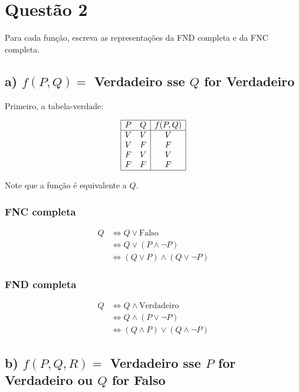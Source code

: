 \section*{Questão 2}

Para cada função, escreva as representações da FND completa e da FNC completa.

\subsection*{a) $f(P, Q) =$ Verdadeiro sse $Q$ for Verdadeiro}

Primeiro, a tabela-verdade:

\[
\begin{array}{|c c|c|}
\hline
P & Q & f(P, Q) \\
\hline
V & V & V \\
V & F & F \\
F & V & V \\
F & F & F \\
\hline
\end{array}
\]

Note que a função é equivalente a $Q$.

\subsubsection*{FNC completa}
\begin{align*}
    Q &\Leftrightarrow Q \lor \text{Falso} \\
      &\Leftrightarrow Q \lor (P \land \lnot P) \\
      &\Leftrightarrow (Q \lor P) \land (Q \lor \lnot P)
\end{align*}

\subsubsection*{FND completa}
\begin{align*}
    Q &\Leftrightarrow Q \land \text{Verdadeiro} \\
      &\Leftrightarrow Q \land (P \lor \lnot P) \\
      &\Leftrightarrow (Q \land P) \lor (Q \land \lnot P)
\end{align*}

\subsection*{b) $f(P, Q, R) =$ Verdadeiro sse $P$ for Verdadeiro ou $Q$ for Falso}

